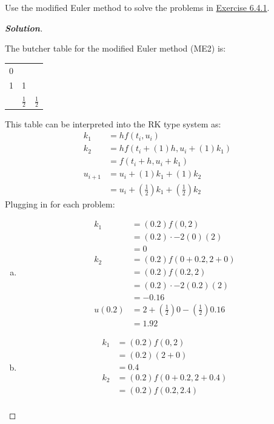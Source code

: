 \documentclass[11pt]{article}
\newenvironment{problem}[2][Question]{\begin{trivlist}
\item[\hskip \labelsep {\bfseries #1}\hskip \labelsep {\bfseries #2.}]}{\end{trivlist}}
\newenvironment{solution}{%
  \begin{proof}[\textbf{Solution}]$ $\par\nobreak\ignorespaces
}{%
  \end{proof}
}
\theoremstyle{definition}
\begin{document}
\begin{problem}{6.4.2}
Use the modified Euler method to solve the problems in \href{https://fncbook.com/rk/#problem-rk-byhand}{Exercise 6.4.1}.
\end{problem}
\begin{solution}
The butcher table for the modified Euler method (ME2) is:
\begin{center}
    \begin{tabular}{c|cc}
    0 & & \\
    1 & 1 & \\\hline
    & $\frac{1}{2}$ & $\frac{1}{2}$
    \end{tabular}
\end{center}
This table can be interpreted into the RK type system as:
\begin{align*}
    k_1 &= h f(t_i, u_i) \\
    k_2 &= h f(t_i + (1)h, u_i + (1)k_1) \\
    &= f(t_i + h, u_i + k_1) \\
    u_{i+1} &= u_i + (1)k_1 + (1)k_2 \\
    &= u_i + (\frac{1}{2})k_1 + (\frac{1}{2})k_2
\end{align*}
Plugging in for each problem:
\begin{enumerate}[(a)]
    \item
    \begin{align*}
        k_1 &= (0.2) f(0, 2) \\
        &= (0.2) \cdot -2(0)(2) \\
        &= 0 \\
        k_2 &= (0.2) f(0 + 0.2, 2 + 0) \\
        &= (0.2) f(0.2, 2) \\
        &= (0.2) \cdot -2(0.2)(2) \\
        &= -0.16 \\
        u(0.2) &= 2 + (\frac{1}{2})0 - (\frac{1}{2})0.16 \\
        &= 1.92
    \end{align*}
    \item
    \begin{align*}
        k_1 &= (0.2) f(0, 2) \\
        &= (0.2) (2 + 0) \\
        &= 0.4 \\
        k_2 &= (0.2) f(0 + 0.2, 2 + 0.4) \\
        &= (0.2) f(0.2, 2.4) \\

\end{align*}
\end{enumerate}
\end{solution}
\end{document}
